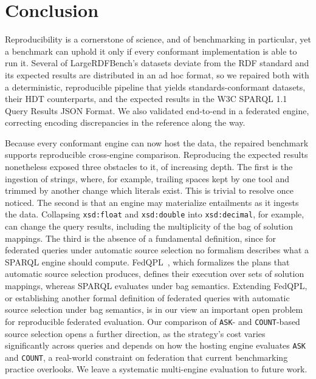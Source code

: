 \section{Conclusion}
\label{sec:conclusion}

Reproducibility is a cornerstone of science, and of benchmarking in particular, yet a benchmark can uphold it only if every conformant implementation is able to run it.
Several of LargeRDFBench's datasets deviate from the \ac{RDF} standard and its expected results are distributed in an ad hoc format, so we repaired both with a deterministic, reproducible pipeline that yields standards-conformant datasets, their \ac{HDT} counterparts, and the expected results in the W3C SPARQL 1.1 Query Results JSON Format.
We also validated end-to-end in a federated engine, correcting encoding discrepancies in the reference along the way.

Because every conformant engine can now host the data, the repaired benchmark supports reproducible cross-engine comparison.
Reproducing the expected results nonetheless exposed three obstacles to it, of increasing depth.
The first is the ingestion of strings, where, for example, trailing spaces kept by one tool and trimmed by another change which literals exist.
This is trivial to resolve once noticed.
The second is that an engine may materialize entailments as it ingests the data.
Collapsing \texttt{xsd:float} and \texttt{xsd:double} into \texttt{xsd:decimal}, for example, can change the query results, including the multiplicity of the bag of solution mappings.
The third is the absence of a fundamental definition, since for federated queries under automatic source selection no formalism describes what a SPARQL engine should compute.
FedQPL~\cite{Cheng2021}, which formalizes the plans that automatic source selection produces, defines their execution over sets of solution mappings, whereas SPARQL evaluates under bag semantics.
Extending FedQPL, or establishing another formal definition of federated queries with automatic source selection under bag semantics, is in our view an important open problem for reproducible federated evaluation.
Our comparison of \texttt{ASK}- and \texttt{COUNT}-based source selection opens a further direction, as the strategy's cost varies significantly across queries and depends on how the hosting engine evaluates \texttt{ASK} and \texttt{COUNT}, a real-world constraint on federation that current benchmarking practice overlooks.
We leave a systematic multi-engine evaluation to future work.
